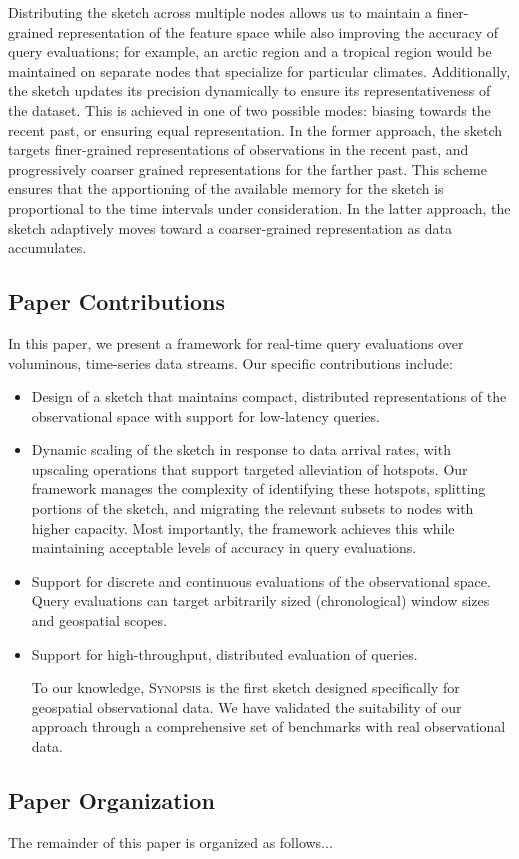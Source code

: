 Distributing the sketch across multiple nodes allows us to maintain a finer-grained representation of the feature space while also improving the accuracy of query evaluations; for example, an arctic region and a tropical region would be maintained on separate nodes that specialize for particular climates. Additionally, the sketch updates its precision dynamically to ensure its representativeness of the dataset. This is achieved in one of two possible modes: biasing towards the recent past, or ensuring equal representation. In the former approach, the sketch targets finer-grained representations of observations in the recent past, and progressively coarser grained representations for the farther past. This scheme ensures that the apportioning of the available memory for the sketch is proportional to the time intervals under consideration.  In the latter approach, the sketch adaptively moves toward a coarser-grained representation as data accumulates.


\subsection{Paper Contributions}
In this paper, we present a framework for real-time query evaluations over voluminous, time-series data streams. Our specific contributions include:
\begin{itemize}
\item   Design of a sketch that maintains compact, distributed representations of the observational space with support for low-latency queries.

\item   Dynamic scaling of the sketch in response to data arrival rates, with upscaling operations that support targeted alleviation of hotspots. Our framework manages the complexity of identifying these hotspots, splitting portions of the sketch, and migrating the relevant subsets to nodes with higher capacity. Most importantly, the framework achieves this while maintaining acceptable levels of accuracy in query evaluations.

\item   Support for discrete and continuous evaluations of the observational space. Query evaluations can target arbitrarily sized (chronological) window sizes and geospatial scopes.

\item   Support for high-throughput, distributed evaluation of queries.

To our knowledge, \textsc{Synopsis} is the first sketch designed specifically for geospatial observational data. We have validated the suitability of our approach through a comprehensive set of benchmarks with real observational data. 
\end{itemize}

\subsection{Paper Organization}
The remainder of this paper is organized as follows...

